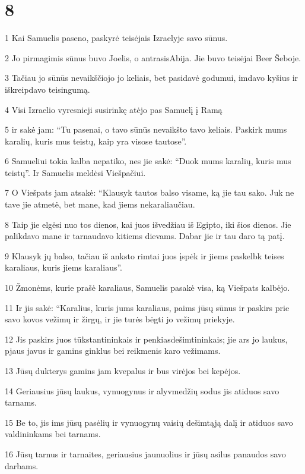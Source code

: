 \chapter{8}

\par 1 Kai Samuelis paseno, paskyrė teisėjais Izraelyje savo sūnus. 
\par 2 Jo pirmagimis sūnus buvo Joelis, o antrasis­Abija. Jie buvo teisėjai Beer Šeboje. 
\par 3 Tačiau jo sūnūs nevaikščiojo jo keliais, bet pasidavė godumui, imdavo kyšius ir iškreipdavo teisingumą. 
\par 4 Visi Izraelio vyresnieji susirinkę atėjo pas Samuelį į Ramą 
\par 5 ir sakė jam: “Tu pasenai, o tavo sūnūs nevaikšto tavo keliais. Paskirk mums karalių, kuris mus teistų, kaip yra visose tautose”. 
\par 6 Samueliui tokia kalba nepatiko, nes jie sakė: “Duok mums karalių, kuris mus teistų”. Ir Samuelis meldėsi Viešpačiui. 
\par 7 O Viešpats jam atsakė: “Klausyk tautos balso visame, ką jie tau sako. Juk ne tave jie atmetė, bet mane, kad jiems nekaraliaučiau. 
\par 8 Taip jie elgėsi nuo tos dienos, kai juos išvedžiau iš Egipto, iki šios dienos. Jie palikdavo mane ir tarnaudavo kitiems dievams. Dabar jie ir tau daro tą patį. 
\par 9 Klausyk jų balso, tačiau iš anksto rimtai juos įspėk ir jiems paskelbk teises karaliaus, kuris jiems karaliaus”. 
\par 10 Žmonėms, kurie prašė karaliaus, Samuelis pasakė visa, ką Viešpats kalbėjo. 
\par 11 Ir jis sakė: “Karalius, kuris jums karaliaus, paims jūsų sūnus ir paskirs prie savo kovos vežimų ir žirgų, ir jie turės bėgti jo vežimų priekyje. 
\par 12 Jis paskirs juos tūkstantininkais ir penkiasdešimtininkais; jie ars jo laukus, pjaus javus ir gamins ginklus bei reikmenis karo vežimams. 
\par 13 Jūsų dukterys gamins jam kvepalus ir bus virėjos bei kepėjos. 
\par 14 Geriausius jūsų laukus, vynuogynus ir alyvmedžių sodus jis atiduos savo tarnams. 
\par 15 Be to, jis ims jūsų pasėlių ir vynuogynų vaisių dešimtąją dalį ir atiduos savo valdininkams bei tarnams. 
\par 16 Jūsų tarnus ir tarnaites, geriausius jaunuolius ir jūsų asilus panaudos savo darbams. 
